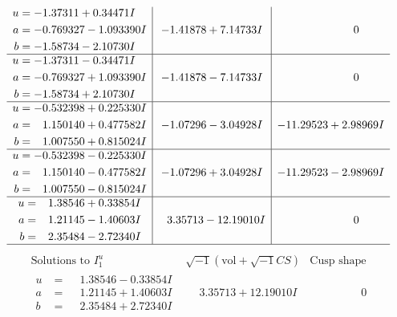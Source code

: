 \documentclass[1p]{elsarticle_modified}
\theoremstyle{definition}
\newcommand{\I}{\sqrt{-1}}
\begin{document}
$$\begin{array}{c|c|c}
\begin{aligned}
u &= -1.37311 + 0.34471 I \\
a &= -0.769327 - 1.093390 I \\
b &= -1.58734 - 2.10730 I\end{aligned}
 & -1.41878 + 7.14733 I & \phantom{-0.000000 } 0 \\ \hline\begin{aligned}
u &= -1.37311 - 0.34471 I \\
a &= -0.769327 + 1.093390 I \\
b &= -1.58734 + 2.10730 I\end{aligned}
 & -1.41878 - 7.14733 I & \phantom{-0.000000 } 0 \\ \hline\begin{aligned}
u &= -0.532398 + 0.225330 I \\
a &= \phantom{-}1.150140 + 0.477582 I \\
b &= \phantom{-}1.007550 + 0.815024 I\end{aligned}
 & -1.07296 - 3.04928 I & -11.29523 + 2.98969 I \\ \hline\begin{aligned}
u &= -0.532398 - 0.225330 I \\
a &= \phantom{-}1.150140 - 0.477582 I \\
b &= \phantom{-}1.007550 - 0.815024 I\end{aligned}
 & -1.07296 + 3.04928 I & -11.29523 - 2.98969 I \\ \hline\begin{aligned}
u &= \phantom{-}1.38546 + 0.33854 I \\
a &= \phantom{-}1.21145 - 1.40603 I \\
b &= \phantom{-}2.35484 - 2.72340 I\end{aligned}
 & \phantom{-}3.35713 - 12.19010 I & \phantom{-0.000000 } 0\\
 \hline 
 \end{array}$$\newpage$$\begin{array}{c|c|c}  
\text{Solutions to }I^u_{1}& \I (\text{vol} + \sqrt{-1}CS) & \text{Cusp shape}\\
 \hline 
\begin{aligned}
u &= \phantom{-}1.38546 - 0.33854 I \\
a &= \phantom{-}1.21145 + 1.40603 I \\
b &= \phantom{-}2.35484 + 2.72340 I\end{aligned}
 & \phantom{-}3.35713 + 12.19010 I & \phantom{-0.000000 } 0 \\ \hline\begin{aligned}

\end{aligned}
\end{array}$$
\end{document}
